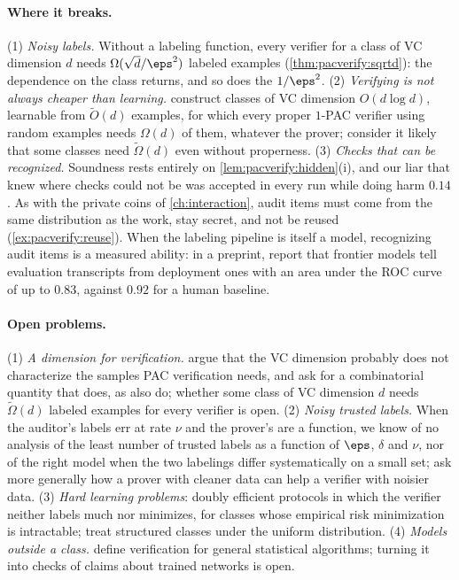 \begin{refsection}
\paragraph{Where it breaks.} (1) \emph{Noisy labels.} Without a labeling function, every verifier for a class of VC dimension $d$ needs $\Omega(\sqrt d/\eps^2)$ labeled examples (\cref{thm:pacverify:sqrtd}): the dependence on the class returns, and so does the $1/\eps^2$. (2) \emph{Verifying is not always cheaper than learning.} \Textcite[Lemma~4.1]{GoldwasserEtAl2021} construct classes of VC dimension $O(d\log d)$, learnable from $\tilde O(d)$ examples, for which every proper $1$-PAC verifier using random examples needs $\Omega(d)$ of them, whatever the prover; \textcite{MutrejaShafer2023} consider it likely that some classes need $\tilde\Omega(d)$ even without properness. (3) \emph{Checks that can be recognized.} Soundness rests entirely on \cref{lem:pacverify:hidden}(i), and our liar that knew where checks could not be was accepted in every run while doing harm $0.14$. As with the private coins of \cref{ch:interaction}, audit items must come from the same distribution as the work, stay secret, and not be reused (\cref{ex:pacverify:reuse}). When the labeling pipeline is itself a model, recognizing audit items is a measured ability: in a preprint, \textcite{NeedhamEtAl2025} report that frontier models tell evaluation transcripts from deployment ones with an area under the ROC curve of up to $0.83$, against $0.92$ for a human baseline.

\paragraph{Open problems.} (1) \emph{A dimension for verification.} \Textcite{MutrejaShafer2023} argue that the VC dimension probably does not characterize the samples PAC verification needs, and ask for a combinatorial quantity that does, as \textcite{GoldwasserEtAl2021} also do; whether some class of VC dimension $d$ needs $\tilde\Omega(d)$ labeled examples for every verifier is open. (2) \emph{Noisy trusted labels.} When the auditor's labels err at rate $\nu$ and the prover's are a function, we know of no analysis of the least number of trusted labels as a function of $\eps$, $\delta$ and $\nu$, nor of the right model when the two labelings differ systematically on a small set; \textcite{GoldwasserEtAl2021} ask more generally how a prover with cleaner data can help a verifier with noisier data. (3) \emph{Hard learning problems}: doubly efficient protocols in which the verifier neither labels much nor minimizes, for classes whose empirical risk minimization is intractable; \textcite{GurEtAl2024} treat structured classes under the uniform distribution. (4) \emph{Models outside a class.} \Textcite{MutrejaShafer2023} define verification for general statistical algorithms; turning it into checks of claims about trained networks is open.


\end{refsection}
